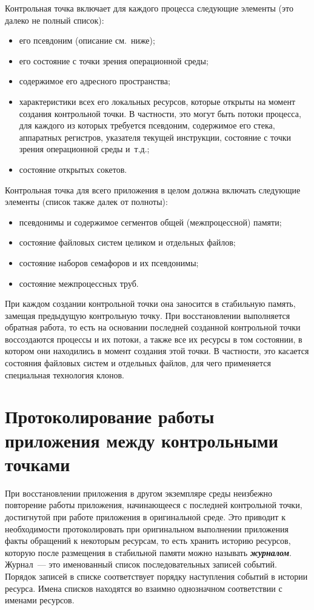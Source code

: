 \begin{multicols}{2}
Контрольная точка включает для каждого процесса следующие элементы
(это далеко не полный список):
\begin{itemize}
\item его псевдоним (описание см.\ ниже);
\item его состояние с точки зрения операционной среды;
\item содержимое его адресного пространства;
\item характеристики всех его локальных ресурсов, которые открыты на
момент создания контрольной точки. В частности, это могут быть потоки
процесса, для каждого из которых требуется псевдоним, содержимое его стека,
аппаратных регистров, указателя текущей инструкции, состояние с точки
зрения операционной среды и~т.д.;
\item состояние открытых сокетов.
\end{itemize}

Контрольная точка для всего приложения в целом должна включать
следующие элементы (список также далек от полноты):
\begin{itemize}
\item псевдонимы и содержимое сегментов общей (межпроцессной) памяти;
\item состояние файловых систем целиком и отдельных файлов;
\item состояние наборов семафоров и их псевдонимы;
\item состояние межпроцессных труб.
\end{itemize}

При каждом создании контрольной точки она заносится в стабильную
память, замещая предыду\-щую контрольную точку. При восстановлении
выполняется обратная работа, то есть на основании последней созданной
контрольной точки воссоздаются процессы и их потоки, а также все их ресурсы
в том состоянии, в котором они находились в момент создания этой точки. В
частности, это касается со\-сто\-яния файловых систем и отдельных файлов, для
чего применяется специальная технология клонов.
{ %

}

\section{Протоколирование работы приложения между
контрольными точками}

При восстановлении приложения в другом экземпляре среды неизбежно
повторение работы приложения, начинающееся с последней контрольной
точки, достигнутой при работе приложения в оригинальной среде. Это
приводит к необходимости протоколировать при оригинальном выполнении
приложения факты обращений к некоторым ресурсам, то есть хранить историю
ресурсов, которую после размещения в стабильной памяти можно называть
{\bfseries\textit{журналом}}. Журнал~--- это именованный список последовательных
записей событий. Порядок записей в списке соответствует порядку наступления
событий в истории ресурса. Имена списков находятся во взаимно однозначном
соответствии с именами ресурсов.


\end{multicols}
